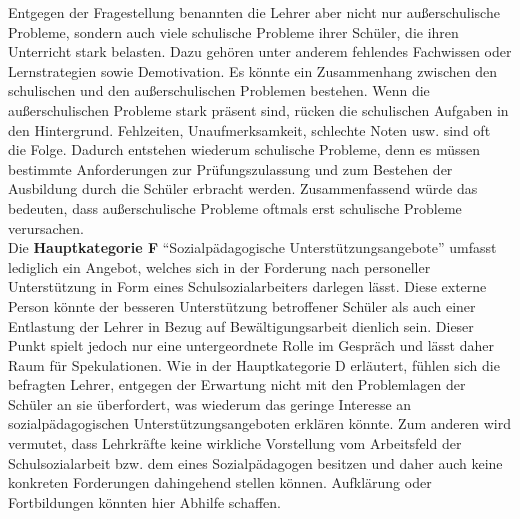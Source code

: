 Entgegen der Fragestellung benannten die Lehrer aber nicht nur außerschulische Probleme, sondern auch viele schulische Probleme ihrer Schüler, die ihren Unterricht stark belasten. Dazu gehören unter anderem fehlendes Fachwissen oder Lernstrategien sowie Demotivation. Es könnte ein Zusammenhang zwischen den schulischen und den außerschulischen Problemen bestehen. Wenn die außerschulischen Probleme stark präsent sind, rücken die schulischen Aufgaben in den Hintergrund. Fehlzeiten, Unaufmerksamkeit, schlechte Noten usw. sind oft die Folge. Dadurch entstehen wiederum schulische Probleme, denn es müssen bestimmte Anforderungen zur Prüfungszulassung und zum Bestehen der Ausbildung durch die Schüler erbracht werden. Zusammenfassend würde das bedeuten, dass außerschulische Probleme oftmals erst schulische Probleme verursachen.\\

\noindent
Die \textbf{Hauptkategorie F} "`Sozialpädagogische Unterstützungsangebote"' umfasst lediglich ein Angebot, welches sich in der Forderung nach personeller Unterstützung in Form eines Schulsozialarbeiters darlegen lässt. Diese externe Person könnte der besseren Unterstützung betroffener Schüler als auch einer Entlastung der Lehrer in Bezug auf Bewältigungsarbeit dienlich sein. Dieser Punkt spielt jedoch nur eine untergeordnete Rolle im Gespräch und lässt daher Raum für Spekulationen. Wie in der Hauptkategorie D erläutert, fühlen sich die befragten Lehrer, entgegen der Erwartung nicht mit den Problemlagen der Schüler an sie überfordert, was wiederum das geringe Interesse an sozialpädagogischen Unterstützungsangeboten erklären könnte. Zum anderen wird vermutet, dass Lehrkräfte keine wirkliche Vorstellung vom Arbeitsfeld der Schulsozialarbeit bzw. dem eines Sozialpädagogen besitzen und daher auch keine konkreten Forderungen dahingehend stellen können. Aufklärung oder Fortbildungen könnten hier Abhilfe schaffen.\\

